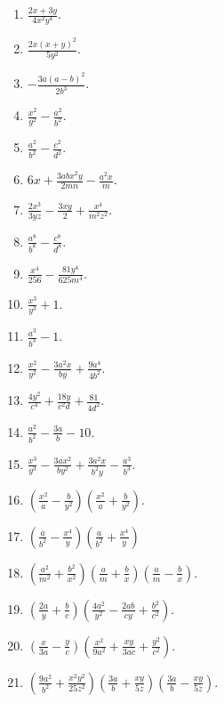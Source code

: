 \documentclass{book}
\begin{document}
\begin{enumerate}
\item $\displaystyle \frac{2x+3y}{4x^2y^4}$. \item $\displaystyle
\frac{2x\left(x+y\right)^2}{5y^2}$. \item $\displaystyle
-\frac{3a \left(a-b \right)^2}{2b^3}$. \item $\displaystyle
\frac{x^2}{y^2}-\frac{a^2}{b^2}$. \item $\displaystyle
\frac{a^2}{b^2}-\frac{c^2}{d^2}$. \item
$6x+\frac{3abx^2y}{2mn}-\frac{a^2x}{m}$. \item $\displaystyle
\frac{2x^3}{3yz}-\frac{3xy}{2}+\frac{x^4}{m^2z^2}$. \item
$\displaystyle \frac{a^8}{b^8}-\frac{c^8}{d^8}$. \item
$\displaystyle \frac{x^4}{256} - \frac{81y^4}{625m^4}$. \item
$\displaystyle \frac{x^3}{y^3}+1$. \item $\displaystyle
\frac{a^3}{b^3}-1$. \item $\displaystyle
\frac{x^2}{y^2}-\frac{3a^2x}{by}+\frac{9a^4}{4b^2}$. \item
$\displaystyle \frac{4y^2}{c^4}+\frac{18y}{c^2d}+\frac{81}{4d^2}$.
\item $\displaystyle \frac{a^2}{b^2}-\frac{3a}{b}-10$.

\item $\displaystyle \frac{x^3}{y^3}-\frac{3ax^2}{by^2}+
  \frac{3a^2x}{b^2y}-\frac{a^3}{b^3}$.

\item $\displaystyle
\left(\frac{x^2}{a}-\frac{b}{y^2}\right)\left(\frac{x^2}{a}+
  \frac{b}{y^2}\right)$.

\item $\displaystyle
\left(\frac{a}{b^2}-\frac{x^4}{y}\right)\left(\frac{a}{b^2}+
  \frac{x^4}{y}\right)$

\item $\displaystyle \left(\frac{a^2}{m^2}+\frac{b^2}{x^2}\right)
  \left(\frac{a}{m}+\frac{b}{x}\right)
  \left(\frac{a}{m}-\frac{b}{x}\right)$.

\item $\displaystyle \left(\frac{2a}{y}+\frac{b}{c}\right)
  \left(\frac{4a^2}{y^2}-\frac{2ab}{cy}+\frac{b^2}{c^2}\right)$.

\item $\displaystyle
\left(\frac{x}{3a}-\frac{y}{c}\right)\left(\frac{x^2}{9a^2}+
  \frac{xy}{3ac}+\frac{y^2}{c^2}\right)$.

\item $\displaystyle
\left(\frac{9a^2}{b^2}+\frac{x^2y^2}{25z^2}\right)
  \left(\frac{3a}{b}+\frac{xy}{5z}\right)
  \left(\frac{3a}{b}-\frac{xy}{5z}\right)$.


\end{enumerate}
\end{document}
